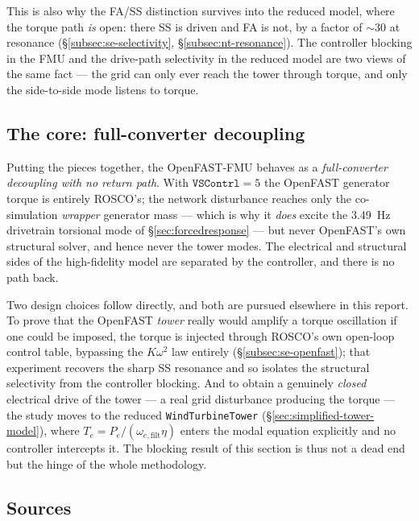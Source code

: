 This is also why the FA/SS distinction survives into the reduced model, where the
torque path \emph{is} open: there SS is driven and FA is not, by a factor of
\(\sim\!30\) at resonance (\S\ref{subsec:se-selectivity},
\S\ref{subsec:nt-resonance}). The controller blocking in the FMU and the drive-path
selectivity in the reduced model are two views of the same fact --- the grid can
only ever reach the tower through torque, and only the side-to-side mode listens to
torque.

\subsection{The core: full-converter decoupling}
\label{subsec:rb-core}

Putting the pieces together, the OpenFAST-FMU behaves as a \emph{full-converter
decoupling with no return path}. With \(\texttt{VSContrl}=5\) the OpenFAST
generator torque is entirely ROSCO's; the network disturbance reaches only the
co-simulation \emph{wrapper} generator mass --- which is why it \emph{does} excite
the \SI{3.49}{\hertz} drivetrain torsional mode of \S\ref{sec:forcedresponse} ---
but never OpenFAST's own structural solver, and hence never the tower modes. The
electrical and structural sides of the high-fidelity model are separated by the
controller, and there is no path back.

Two design choices follow directly, and both are pursued elsewhere in this report.
To prove that the OpenFAST \emph{tower} really would amplify a torque oscillation
if one could be imposed, the torque is injected through ROSCO's own open-loop
control table, bypassing the \(K\omega^2\) law entirely
(\S\ref{subsec:se-openfast}); that experiment recovers the sharp SS resonance and
so isolates the structural selectivity from the controller blocking. And to obtain
a genuinely \emph{closed} electrical drive of the tower --- a real grid
disturbance producing the torque --- the study moves to the reduced
\texttt{WindTurbineTower} (\S\ref{sec:simplified-tower-model}), where
\(T_e = P_e/(\omega_{e,\mathrm{filt}}\eta)\) enters the modal equation explicitly
and no controller intercepts it. The blocking result of this section is thus not a
dead end but the hinge of the whole methodology.

\subsection*{Sources}
\label{subsec:rb-sources}

